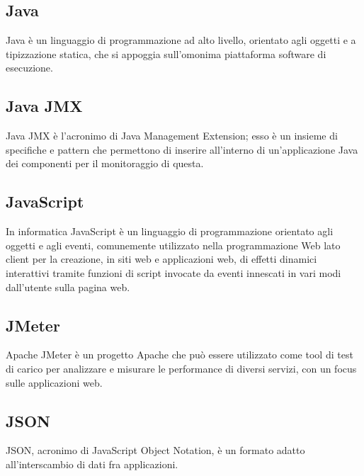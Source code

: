 
\subsection*{Java}
Java è un linguaggio di programmazione ad alto livello, orientato agli oggetti e a tipizzazione statica, che si appoggia sull'omonima piattaforma software di esecuzione.

\subsection*{Java JMX}
Java JMX è l'acronimo di Java Management Extension; esso è un insieme di specifiche e pattern che permettono di inserire all'interno di un'applicazione Java dei componenti per il monitoraggio di questa.

\subsection*{JavaScript}
In informatica JavaScript è un linguaggio di programmazione orientato agli oggetti e agli eventi, comunemente utilizzato nella programmazione Web lato client per la creazione, in siti web e applicazioni web, di effetti dinamici interattivi tramite funzioni di script invocate da eventi innescati in vari modi dall'utente sulla pagina web.

\subsection*{JMeter}
Apache JMeter è un progetto Apache che può essere utilizzato come tool di test di carico per analizzare e misurare le performance di diversi servizi, con un focus sulle applicazioni web.

\subsection*{JSON}
JSON, acronimo di JavaScript Object Notation, è un formato adatto all'interscambio di dati fra applicazioni.

